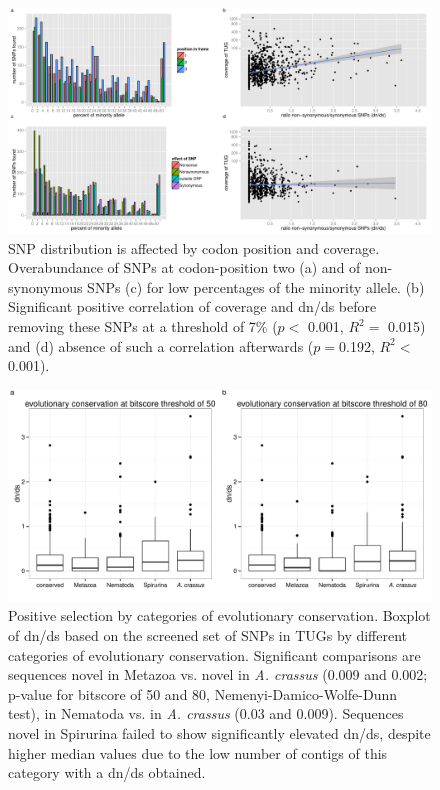 \documentclass[12pt,a4paper]{article}
\begin{document}
\begin{figure}
  \centering
\includegraphics{../figures/Additional_Figure_2.pdf}
\caption[SNP distribution is affected by codon position and
coverage]{SNP distribution is affected by codon position and
  coverage. Overabundance of SNPs at codon-position two (a) and of
  non-synonymous SNPs (c) for low percentages of the minority
  allele. (b) Significant positive correlation of coverage and dn/ds
  before removing these SNPs at a threshold of 7\% ($p<$ 0.001, $R^2=$
  0.015) and (d) absence of such a correlation afterwards ($p=$0.192,
  $R^2<$0.001).}
\end{figure}

\newpage
\clearpage

\begin{figure}
  \centering
\includegraphics{../figures/Additional_Figure_3.pdf}
\caption[Positive selection by categories of evolutionary
conservation]{Positive selection by categories of evolutionary
  conservation. Boxplot of dn/ds based on the screened set of SNPs in
  TUGs by different categories of evolutionary
  conservation. Significant comparisons are sequences novel in Metazoa
  vs. novel in \textit{A. crassus} (0.009 and 0.002; p-value for
  bitscore of 50 and 80, Nemenyi-Damico-Wolfe-Dunn test), in Nematoda
  vs. in \textit{A. crassus} (0.03 and 0.009). Sequences novel in
  Spirurina failed to show significantly elevated dn/ds, despite
  higher median values due to the low number of contigs of this
  category with a dn/ds obtained.}
\end{figure}
\end{document}

